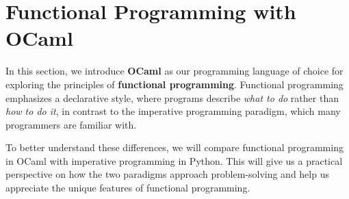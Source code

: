 \section{Functional Programming with OCaml}

In this section, we introduce \textbf{OCaml} as our programming language of choice for exploring
the principles of \textbf{functional programming}. Functional programming emphasizes a declarative
style, where programs describe \textit{what to do} rather than \textit{how to do it},
in contrast to the imperative programming paradigm, which many programmers are familiar with.

To better understand these differences, we will compare functional programming in OCaml with
imperative programming in Python. This will give us a practical perspective on how the two
paradigms approach problem-solving and help us appreciate the unique features of functional programming.

\newpage